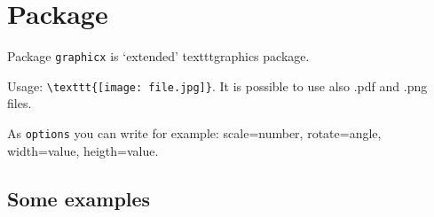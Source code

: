 \documentclass{article}
\begin{document}
\newpage

\section*{Package }

Package \verb|graphicx| is ‘extended’ textttgraphics package.

Usage: \verb|\texttt{[image: file.jpg]}|. It is possible to use also
.pdf and .png files.

As \verb|options| you can write for example: scale=number, rotate=angle, width=value,
heigth=value.

\subsection*{Some examples}
\end{document}
